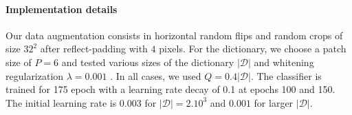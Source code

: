 \documentclass{article} %
\begin{document}

 \paragraph{Implementation details}
Our data augmentation consists in horizontal random flips and random crops of size $32^2$ after reflect-padding with $4$ pixels. 
For the dictionary, we choose a patch size of $P=6$ and tested various sizes of the dictionary $|\mathcal{D}|$ and whitening regularization $\lambda=0.001$ . 
In all cases, we used $Q=0.4 |\mathcal{D}|$.  The classifier is trained for 175 epoch with a learning rate decay 
of 0.1 at epochs 100 and 150.
The initial learning rate is $0.003$ for $|\mathcal{D}|=2.10^3$
and $0.001$ for larger $|\mathcal{D}|$.
\end{document}

